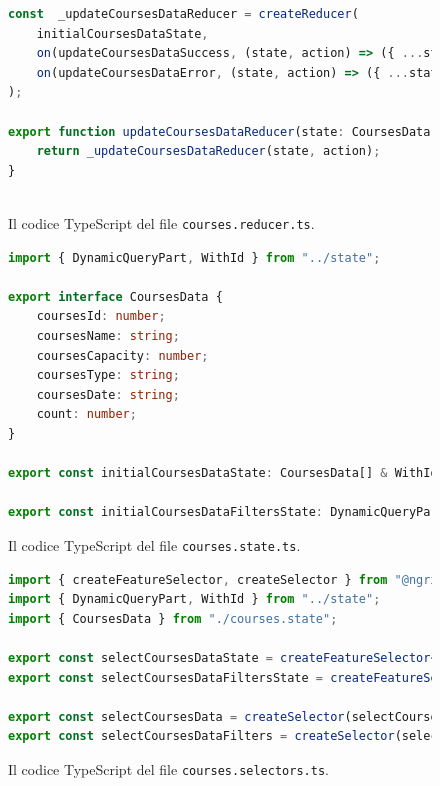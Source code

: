 \begin{figure}[H]
\begin{lstlisting}[language=TypeScript, linewidth=20cm, basicstyle=\tiny]
const  _updateCoursesDataReducer = createReducer(
    initialCoursesDataState,
    on(updateCoursesDataSuccess, (state, action) => ({ ...state, _id: action._id, coursesData: action.result })),
    on(updateCoursesDataError, (state, action) => ({ ...state, _id: action._id, error: action.error }))
);

export function updateCoursesDataReducer(state: CoursesData[] & WithId, action: Action): CoursesData[] & WithId{
    return _updateCoursesDataReducer(state, action);
}
  
\end{lstlisting}
\caption{\label{fig:courses.reducer}Il codice TypeScript del file \texttt{courses.reducer.ts}.}
\end{figure}

\begin{figure}[H]
\centering
\begin{lstlisting}[language=TypeScript, linewidth=20cm, basicstyle=\tiny]
import { DynamicQueryPart, WithId } from "../state";

export interface CoursesData {
    coursesId: number;
    coursesName: string;
    coursesCapacity: number;
    coursesType: string;
    coursesDate: string;
    count: number;
}

export const initialCoursesDataState: CoursesData[] & WithId = Object.assign([], {_id: ''});

export const initialCoursesDataFiltersState: DynamicQueryPart & WithId = {_id: ''};
\end{lstlisting}
\caption{\label{fig:courses.state}Il codice TypeScript del file \texttt{courses.state.ts}.}
\end{figure}

\begin{figure}[H]
\centering
\begin{lstlisting}[language=TypeScript, linewidth=20cm, basicstyle=\tiny]
import { createFeatureSelector, createSelector } from "@ngrx/store";
import { DynamicQueryPart, WithId } from "../state";
import { CoursesData } from "./courses.state";

export const selectCoursesDataState = createFeatureSelector<CoursesData[]>('coursesData');
export const selectCoursesDataFiltersState = createFeatureSelector<DynamicQueryPart>('coursesDataFilters');

export const selectCoursesData = createSelector(selectCoursesDataState, (state: CoursesData[] & WithId) => state);
export const selectCoursesDataFilters = createSelector(selectCoursesDataFiltersState, (state: DynamicQueryPart & WithId) => state);
\end{lstlisting}
\caption{\label{fig:courses.selectors}Il codice TypeScript del file \texttt{courses.selectors.ts}.}
\end{figure}

